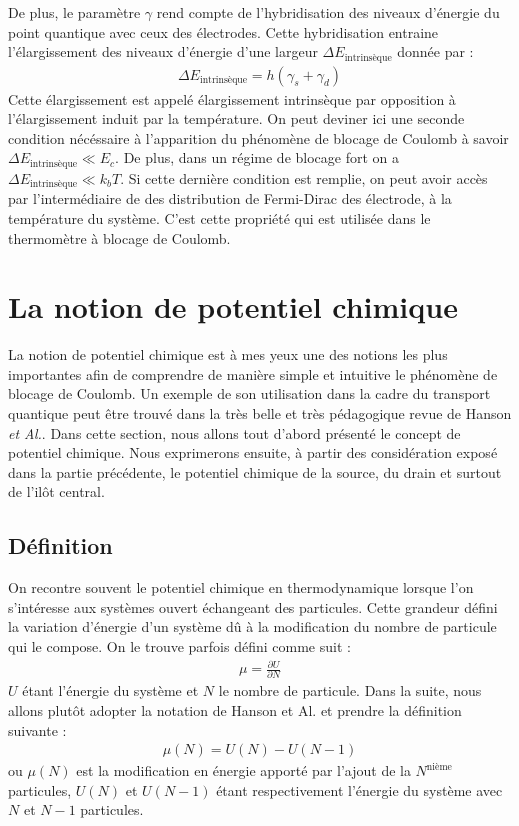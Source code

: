 De plus, le paramètre $\gamma$ rend compte de l'hybridisation des niveaux d'énergie du point quantique avec ceux des électrodes. Cette hybridisation entraine l'élargissement des niveaux d'énergie d'une largeur $\Delta E_{\text{intrinsèque}}$ donnée par :
\begin{eqnarray}
\Delta E_{\text{intrinsèque}} = h (\gamma_s + \gamma_d)
\end{eqnarray}
Cette élargissement est appelé élargissement intrinsèque par opposition à l'élargissement induit par la température. On peut deviner ici une seconde condition nécéssaire à l'apparition du phénomène de blocage de Coulomb à savoir $\Delta E_{\text{intrinsèque}} \ll E_c$. De plus, dans un régime de blocage fort on a $\Delta E_{\text{intrinsèque}} \ll k_bT$. Si cette dernière condition est remplie, on peut avoir accès par l'intermédiaire de des distribution de Fermi-Dirac des électrode, à la température du système. C'est cette propriété qui est utilisée dans le thermomètre à blocage de Coulomb.





\section{La notion de potentiel chimique}
La notion de potentiel chimique est à mes yeux une des notions les plus importantes afin de comprendre de manière simple et intuitive le phénomène de blocage de Coulomb. Un exemple de son utilisation dans la cadre du transport quantique peut \^etre trouvé dans la très belle et très pédagogique revue de Hanson \textit{et Al.}. Dans cette section, nous allons tout d'abord présenté le concept de potentiel chimique. Nous exprimerons ensuite, à partir des considération exposé dans la partie précédente, le potentiel chimique de la source, du drain et surtout de l'ilôt central.

\subsection{Définition}

On recontre souvent le potentiel chimique en thermodynamique lorsque l'on s'intéresse aux systèmes ouvert échangeant des particules. Cette grandeur défini la variation d'énergie d'un système d\^u à la modification du nombre de particule qui le compose. On le trouve parfois défini comme suit :
\begin{eqnarray}
\mu = \frac{\partial U}{\partial N} \nonumber
\end{eqnarray}
$U$ étant l'énergie du système et $N$ le nombre de particule. Dans la suite, nous allons plut\^ot adopter la notation de Hanson et Al. et prendre la définition suivante :
\begin{eqnarray}
\mu(N) = U(N) - U(N-1)
\end{eqnarray}
ou $\mu(N)$ est la modification en énergie apporté par l'ajout de la $N^\text{nième}$ particules, $U(N)$ et $U(N-1)$ étant respectivement l'énergie du système avec $N$ et $N-1$ particules.

